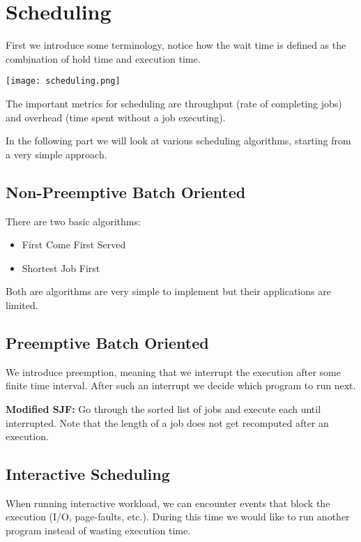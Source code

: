\section{Scheduling}

First we introduce some terminology, notice how the wait time is defined as the combination of hold time and execution time.
\begin{center}
	\texttt{[image: scheduling.png]}
\end{center}

The important metrics for scheduling are throughput (rate of completing jobs) and overhead (time spent without a job executing).

In the following part we will look at various scheduling algorithms, starting from a very simple approach.

\subsection{Non-Preemptive Batch Oriented}

There are two basic algorithms:
\begin{itemize}
	\item First Come First Served
	\item Shortest Job First
\end{itemize}

Both are algorithms are very simple to implement but their applications are limited.

\subsection{Preemptive Batch Oriented}

We introduce preemption, meaning that we interrupt the execution after some finite time interval. After such an interrupt we decide which program to run next. \smallskip

\textbf{Modified SJF:} Go through the sorted list of jobs and execute each until interrupted. Note that the length of a job does not get recomputed after an execution. \smallskip

\subsection{Interactive Scheduling}

When running interactive workload, we can encounter events that block the execution (I/O, page-faults, etc.). During this time we would like to run another program instead of wasting execution time. \smallskip

